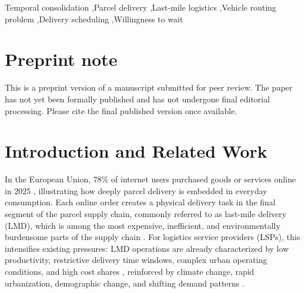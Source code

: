 \documentclass[preprint,12pt,authoryear]{elsarticle}
\begin{document}
\begin{frontmatter}
\begin{abstract}







\end{abstract}


\begin{keyword}
Temporal consolidation \sep Parcel delivery \sep Last-mile logistics \sep Vehicle routing problem \sep Delivery scheduling \sep Willingness to wait






\end{keyword}
\end{frontmatter}

\section*{Preprint note}

This is a preprint version of a manuscript submitted for peer review. The paper has not yet been formally published and has not undergone final editorial processing. Please cite the final published version once available.


\section{Introduction and Related Work}
\label{intro}

In the European Union, $78\%$ of internet users purchased goods or services online in 2025 \citep{Eurostat2025}, illustrating how deeply parcel delivery is embedded in everyday consumption. Each online order creates a physical delivery task in the final segment of the parcel supply chain, commonly referred to as last-mile delivery (LMD), which is among the most expensive, inefficient, and environmentally burdensome parts of the supply chain \citep{Olsson2019}. For logistics service providers (LSPs), this intensifies existing pressures: LMD operations are already characterized by low productivity, restrictive delivery time windows, complex urban operating conditions, and high cost shares \citep{BACHOFNER2022100020}, reinforced by climate change, rapid urbanization, demographic change, and shifting demand patterns \citep{logistics2040025}.
\end{document}
